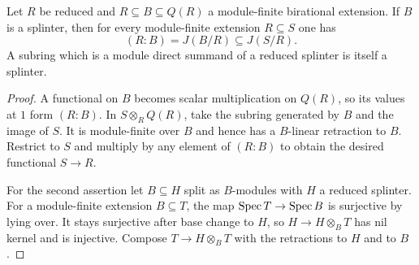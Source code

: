 \begin{lemma}\label{conductor-lower}
Let $R$ be reduced and $R\subseteq B\subseteq Q(R)$ a module-finite birational extension. If $B$ is a splinter, then for every module-finite extension $R\subseteq S$ one has
\[
 (R:B)=J(B/R)\subseteq J(S/R).
\]
A subring which is a module direct summand of a reduced splinter is itself a splinter.
\end{lemma}
\begin{proof}
A functional on $B$ becomes scalar multiplication on $Q(R)$, so its values at $1$ form $(R:B)$. In $S\otimes_R Q(R)$, take the subring generated by $B$ and the image of $S$. It is module-finite over $B$ and hence has a $B$-linear retraction to $B$. Restrict to $S$ and multiply by any element of $(R:B)$ to obtain the desired functional $S\to R$.

For the second assertion let $B\subseteq H$ split as $B$-modules with $H$ a reduced splinter. For a module-finite extension $B\subseteq T$, the map $\operatorname{Spec} T\to\operatorname{Spec} B$ is surjective by lying over. It stays surjective after base change to $H$, so $H\to H\otimes_B T$ has nil kernel and is injective. Compose $T\to H\otimes_B T$ with the retractions to $H$ and to $B$.
\end{proof}

